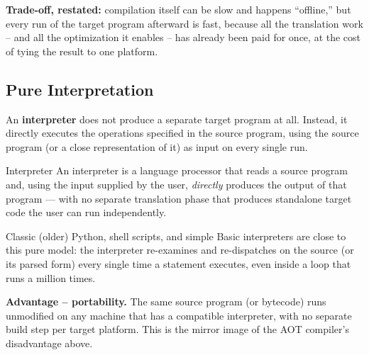 \documentclass[full-course-notes.tex]{subfiles}
\begin{document}
\textbf{Trade-off, restated:} compilation itself can be slow and happens ``offline,'' but every
run of the target program afterward is fast, because all the translation work -- and all the
optimization it enables -- has already been paid for once, at the cost of tying the result to one
platform.

\subsection{Pure Interpretation}
\label{sec:l1-pure-interpretation}

\dbtag An \textbf{interpreter} does not produce a separate target program at all. Instead, it
directly executes the operations specified in the source program, using the source program (or a
close representation of it) as input on every single run.

\begin{defbox}{Interpreter}
An interpreter is a language processor that reads a source program and, using the input
supplied by the user, \emph{directly} produces the output of that program --- with no separate
translation phase that produces standalone target code the user can run independently.
\end{defbox}

\begin{center}
\end{center}

Classic (older) Python, shell scripts, and simple Basic interpreters are close to this pure
model: the interpreter re-examines and re-dispatches on the source (or its parsed form) every
single time a statement executes, even inside a loop that runs a million times.

\textbf{Advantage -- portability.} The same source program (or bytecode) runs unmodified on any
machine that has a compatible interpreter, with no separate build step per target platform. This
is the mirror image of the AOT compiler's disadvantage above.
\end{document}

